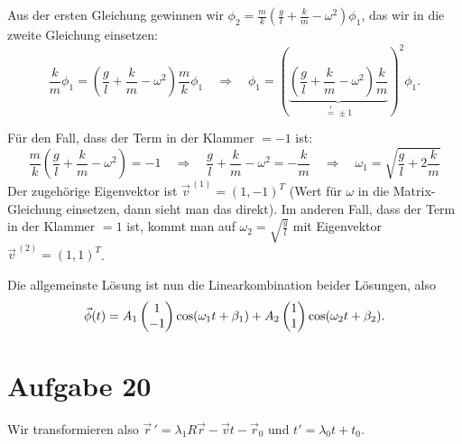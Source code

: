 Aus der ersten Gleichung gewinnen wir $\phi_2 = \frac{m}{k} \left( \frac{g}{l} + \frac{k}{m} - \omega^2 \right) \phi_1$, das wir in die zweite Gleichung einsetzen:
\[
	\frac{k}{m} \phi_1 = \left( \frac{g}{l} + \frac{k}{m} - \omega^2 \right) \frac{m}{k} \phi_1
	\quad \Longrightarrow \quad 
	\phi_1 = \left( \underbrace{\left( \frac{g}{l} + \frac{k}{m} - \omega^2 \right) \frac{k}{m}}_{\overset{!}{=} \pm 1} \right)^2 \phi_1
	\text{.}
\]

Für den Fall, dass der Term in der Klammer $= -1$ ist: 
\[
	\frac{m}{k} \left( \frac{g}{l} + \frac{k}{m} - \omega^2 \right) = -1
	\quad \Longrightarrow \quad 
	\frac{g}{l} + \frac{k}{m} - \omega^2 = - \frac{k}{m} 
	\quad \Longrightarrow \quad 
	\omega_1 = \sqrt{\frac{g}{l} + 2 \frac{k}{m}}
\]
Der zugehörige Eigenvektor ist $\vec{v}^{\,(1)} = (1, -1)^T$ (Wert für $\omega$ in die Matrix-Gleichung einsetzen, dann sieht man das direkt). Im anderen Fall, dass der Term in der Klammer $= 1$ ist, kommt man auf $\omega_2 = \sqrt{\frac{g}{l}}$ mit Eigenvektor $\vec{v}^{\,(2)} = (1, 1)^T$.

Die allgemeinste Lösung ist nun die Linearkombination beider Lösungen, also 
\[
	\vec{\phi}(t) = A_1 \begin{pmatrix} 1 \\ -1 \end{pmatrix} \cos(\omega_1 t + \beta_1) + A_2 \begin{pmatrix} 1 \\ 1 \end{pmatrix} \cos(\omega_2 t + \beta_2)
	\text{.}
\]

\section*{Aufgabe 20}

Wir transformieren also $\vec{r}\,' = \lambda_1 R \vec{r} - \vec{v} t - \vec{r}_0$ und $t' = \lambda_0 t + t_0$.

